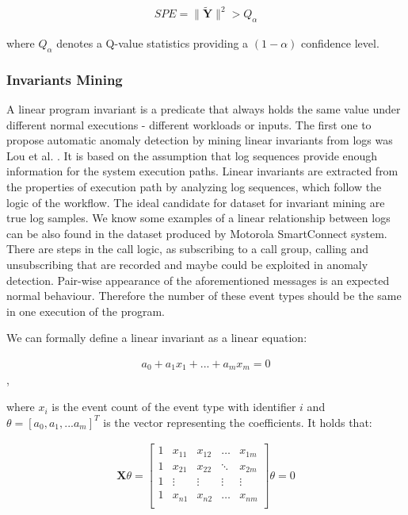 \begin{gather}
    SPE = \parallel \mathbf{\widetilde{Y}} \parallel^2 > Q_{\alpha} 
\end{gather}
 
 where $Q_{\alpha}$ denotes a Q-value statistics providing a $(1 - \alpha)$ confidence level. 
 
 

 \subsubsection{Invariants Mining}
 \label{section:lrInvariantMining}
 
A linear program invariant is a predicate that always holds the same value under different normal executions - different workloads or inputs. The first one to propose automatic anomaly detection by mining linear invariants from logs was Lou et al. \cite{lou2010}. It is based on the assumption that log sequences provide enough information for the system execution paths. Linear invariants are extracted from the properties of execution path by analyzing log sequences, which follow the logic of the workflow. The ideal candidate for dataset for invariant mining are true log samples. We know some examples of a linear relationship between logs can be also found in the dataset produced by Motorola SmartConnect system. 
There are steps in the call logic, as subscribing to a call group, calling and unsubscribing that are recorded and maybe could be exploited in anomaly detection. Pair-wise appearance of the aforementioned messages is an expected normal behaviour. Therefore the number of these event types should be the same in one execution of the program. 

We can formally define a linear invariant as a linear equation: 

\begin{gather}
    a_0 + a_1 x_1 + ... + a_m x_m = 0
\end{gather},

where $x_i$ is the event count of the event type with identifier $i$ and $\theta = [a_0, a_1, ... a_m]^T$ is the vector representing the coefficients. It holds that: 

\begin{gather}
\mathbf{X} \theta = 
\begin{bmatrix}
1 & x_{11} & x_{12} & \hdots & x_{1m}\\
1 & x_{21} & x_{22} & \ddots & x_{2m}\\
1 & \vdots & \vdots & \vdots &\vdots \\
1 & x_{n1} & x_{n2} & \hdots & x_{nm}\\
\end{bmatrix}
\theta = 0
\end{gather}

